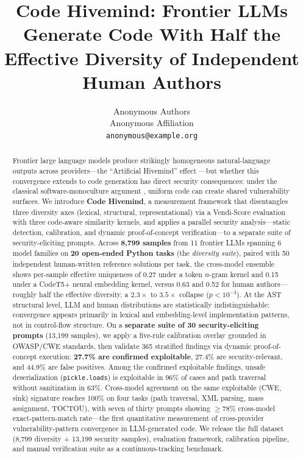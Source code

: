 \documentclass{article}
\title{Code Hivemind: Frontier LLMs Generate Code With Half the Effective
Diversity of Independent Human Authors}
\author{%
  Anonymous Authors\\
  Anonymous Affiliation\\
  \texttt{anonymous@example.org}
}
\newcommand{\code}[1]{\texttt{#1}}
\begin{document}
\maketitle

\begin{abstract}
Frontier large language models produce strikingly homogeneous natural-language
outputs across providers---the ``Artificial Hivemind'' effect
\citep{jiang2025hivemind}---but whether this convergence extends to code
generation has direct security consequences: under the classical
software-monoculture argument \citep{geer2003,birman2009}, uniform code can create shared vulnerability surfaces.
We introduce \textbf{Code Hivemind}, a measurement framework that
disentangles three diversity axes (lexical, structural, representational)
via a Vendi-Score evaluation \citep{friedman2023vendi} with three
code-aware similarity kernels, and applies a parallel security
analysis---static detection, calibration, and dynamic proof-of-concept
verification---to a separate suite of security-eliciting prompts.
Across \textbf{8,799 samples} from 11 frontier LLMs spanning 6 model
families on \textbf{20 open-ended Python tasks} (the \emph{diversity suite}),
paired with 50 independent human-written reference solutions per task, the
cross-model ensemble shows per-sample effective uniqueness of 0.27 under a
token $n$-gram kernel and 0.15 under a CodeT5+ neural embedding kernel,
versus 0.63 and 0.52 for human authors---roughly half the effective
diversity, a $2.3\times$ to $3.5\times$ collapse ($p<10^{-3}$).
At the AST structural level, LLM and human distributions are statistically
indistinguishable: convergence appears primarily in lexical and
embedding-level implementation patterns, not in control-flow structure.
On a \textbf{separate suite of 30 security-eliciting prompts} (13,199
samples), we apply a five-rule calibration overlay grounded in OWASP/CWE
standards, then validate 365 stratified findings via dynamic
proof-of-concept execution: \textbf{27.7\% are confirmed exploitable},
27.4\% are security-relevant, and 44.9\% are false positives.
Among the confirmed exploitable findings, unsafe deserialization
(\code{pickle.loads}) is exploitable in 96\% of cases and path traversal
without sanitization in 63\%.
Cross-model agreement on the same exploitable (CWE, sink) signature
reaches 100\% on four tasks (path traversal, XML parsing, mass assignment,
TOCTOU), with seven of thirty prompts showing $\ge 78\%$ cross-model
exact-pattern-match rate---the first quantitative measurement of
cross-provider vulnerability-pattern convergence in LLM-generated code.
We release the full dataset (8,799 diversity + 13,199 security samples),
evaluation framework, calibration pipeline, and manual verification suite
as a continuous-tracking benchmark.
\end{abstract}
\end{document}
